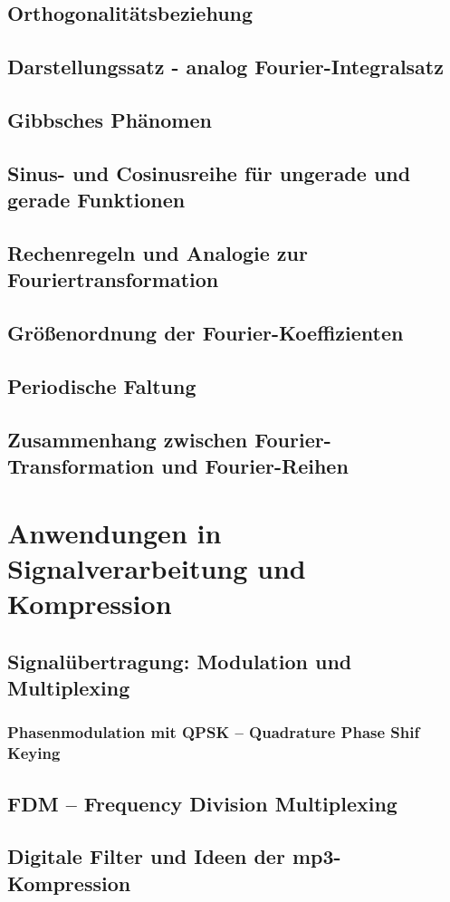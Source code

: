 \documentclass[a4paper]{article}
\begin{document}
\subsection{Orthogonalitätsbeziehung}
\subsection{Darstellungssatz - analog Fourier-Integralsatz}
\subsection{Gibbsches Phänomen}
\subsection{Sinus- und Cosinusreihe für ungerade und gerade Funktionen}
\subsection{Rechenregeln und Analogie zur Fouriertransformation}
\subsection{Größenordnung der Fourier-Koeffizienten}
\subsection{Periodische Faltung}
\subsection{Zusammenhang zwischen Fourier-Transformation und Fourier-Reihen}
\section{Anwendungen in Signalverarbeitung und Kompression}
\subsection{Signalübertragung: Modulation und Multiplexing}
\subsubsection{Phasenmodulation mit QPSK – Quadrature Phase Shif Keying}
\subsection{FDM – Frequency Division Multiplexing}
\subsection{Digitale Filter und Ideen der mp3-Kompression}
\end{document}
